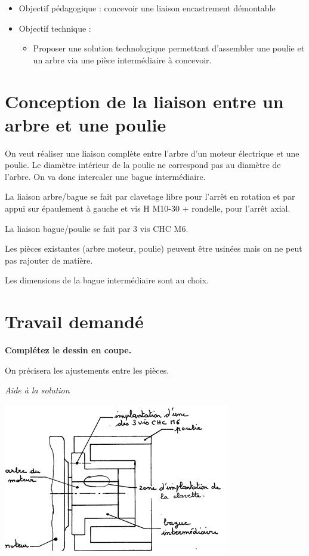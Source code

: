 \documentclass[11pt,oneside]{article}
\begin{document}
\begin{contexte}
\begin{itemize}
\item Objectif pédagogique : concevoir une liaison encastrement démontable
\item Objectif technique : 
\begin{itemize}
\item Proposer une solution technologique permettant d'assembler une poulie et un arbre via une pièce intermédiaire à concevoir. 
\end{itemize}
\end{itemize}
\end{contexte}

\section*{Conception de la liaison entre un arbre et une poulie}
On veut réaliser une liaison complète entre l'arbre d'un moteur électrique et une poulie. Le diamètre intérieur de la poulie ne correspond pas au diamètre de l'arbre. On va donc intercaler une bague intermédiaire.

La liaison arbre/bague se fait par clavetage libre pour l'arrêt en rotation et par appui sur épaulement à gauche et vis H M10-30 + rondelle, pour l'arrêt axial.

La liaison bague/poulie se fait par 3 vis CHC M6.

Les pièces existantes (arbre moteur, poulie) peuvent être usinées mais on ne peut pas rajouter de matière.

Les dimensions de la bague intermédiaire sont au choix.

\section*{Travail demandé}

\textbf{Complétez le dessin en coupe.}

On précisera les ajustements entre les pièces. 



\textit{Aide à la solution}

\begin{center}
\includegraphics[width=.5\textwidth]{png/aide}
\end{center}
\end{document}
